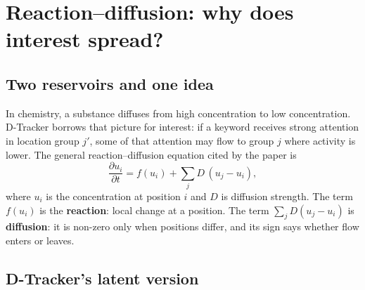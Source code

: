 \section{Reaction--diffusion: why does interest spread?}
\label{sec:reaction-diffusion}

\subsection{Two reservoirs and one idea}

In chemistry, a substance diffuses from high concentration to low concentration. D-Tracker borrows
that picture for interest: if a keyword receives strong attention in location group $j'$, some of
that attention may flow to group $j$ where activity is lower. The general reaction--diffusion
equation cited by the paper is
\begin{equation}
  \frac{\partial u_i}{\partial t}
  =f(u_i)+\sum_j D\,(u_j-u_i),
  \label{eq:rd-background}
\end{equation}
where $u_i$ is the concentration at position $i$ and $D$ is diffusion strength. The term $f(u_i)$ is
the \textbf{reaction}: local change at a position. The term $\sum_j D(u_j-u_i)$ is
\textbf{diffusion}: it is non-zero only when positions differ, and its sign says whether flow enters
or leaves.

\begin{center}
\end{center}

\subsection{D-Tracker's latent version}

